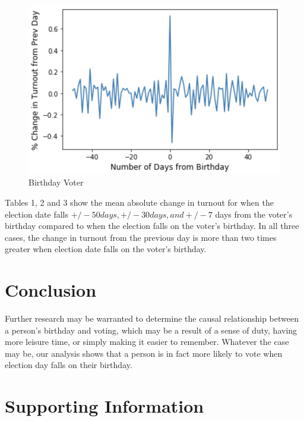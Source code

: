 \documentclass[12pt, letterpaper]{article}
\begin{document}
\begin{figure}[H]
\centering
 \includegraphics[scale=.7]{../figs/fig1.png}
 \caption{Birthday Voter}
 \label{fig:birthday}
\end{figure}

Tables 1, 2 and 3 show the mean absolute change in turnout for when the election date falls $+/- 50 days,+/-  30 days, and +/- 7$ days from the voter's birthday compared to when the election falls on the voter's birthday. In all three cases, the change in turnout from the previous day is more than two times greater when election date falls on the voter’s birthday.

\section{Conclusion}
Further research may be warranted to determine the causal relationship between a person's birthday and voting, which may be a result of a sense of duty, having more leisure time, or simply making it easier to remember. Whatever the case may be, our analysis shows that a person is in fact more likely to vote when election day falls on their birthday. 

\clearpage

  

\clearpage
\appendix
\renewcommand{\thesection}{SI \arabic{section}}
\renewcommand\thetable{\thesection.\arabic{table}}  
\renewcommand\thefigure{\thesection.\arabic{figure}}

\section{Supporting Information}
\end{document}
